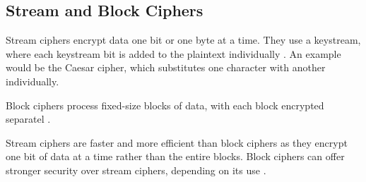 \subsection{Stream and Block Ciphers}

Stream ciphers encrypt data one bit or one byte at a time.
They use a keystream, where each keystream bit is added to the plaintext individually \cite{Paar2024}.
An example would be the Caesar cipher, which substitutes one character with another individually.

Block ciphers process fixed-size blocks of data, with each block encrypted separatel \cite{Paar2024}.

Stream ciphers are faster and more efficient than block ciphers as they encrypt one bit of data at a time rather than the entire blocks. 
Block ciphers can offer stronger security over stream ciphers, depending on its use \cite{Paar2024}. 